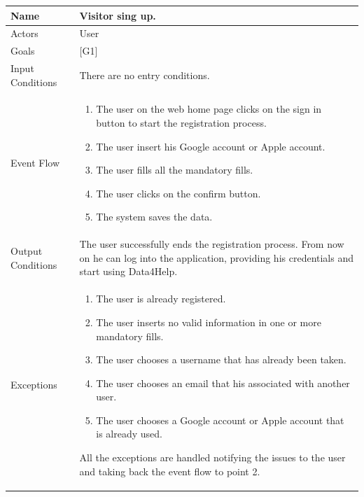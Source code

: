 \documentclass{article}
\begin{document}
\begin{center}
    \begin{tabular}{ | l | p{10cm} |}
    \hline
    Name & Visitor sing up.\\ \hline
    Actors & User\\ \hline
   	Goals & {[G1]}\\ \hline
    Input Conditions & There are no entry conditions.\\ \hline
    Event Flow & \begin{enumerate}
    	\item The user on the web home page clicks on the sign in button to start the registration process.
    	\item The user insert his Google account or Apple account.
    	\item The user fills all the mandatory fills.
		\item The user clicks on the confirm button.
		\item The system saves the data.
    \end{enumerate} \\ \hline
    Output Conditions & The user successfully ends the registration process. From now on he can log into the application, providing his credentials and start using Data4Help. \\ \hline
    Exceptions & \begin{enumerate}
    	\item The user is already registered.
		\item The user inserts no valid information in one or more mandatory fills.
		\item The user chooses a username that has already been taken. 
		\item The user chooses an email that his associated with another user.
		\item The user chooses a Google account or Apple account that is already used.
	\end{enumerate}
All the exceptions are handled notifying the issues to the user and taking back the event flow to point 2.
    \\ \hline
    \end{tabular}
\end{center}
\end{document}

